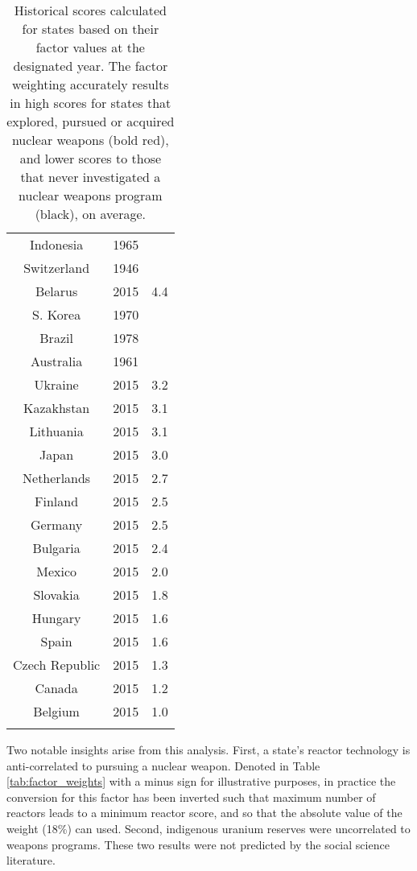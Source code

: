 \begin{table}
\begin{minipage}{.5\textwidth}
\begin{tabular}{|c|c|c|}
Indonesia & 1965 & \textbf{\color{red}{4.4}} \\
Switzerland & 1946 & \textbf{\color{red}{4.4}} \\
Belarus & 2015 & 4.4 \\
S. Korea & 1970 & \textbf{\color{red}{4.4}} \\
Brazil & 1978 & \textbf{\color{red}{4.3}} \\
Australia & 1961 & \textbf{\color{red}{3.9}} \\
Ukraine & 2015 & 3.2 \\
Kazakhstan & 2015 & 3.1 \\
Lithuania & 2015 & 3.1 \\
Japan & 2015 & 3.0 \\
Netherlands & 2015 & 2.7 \\
Finland & 2015 & 2.5 \\
Germany & 2015 & 2.5 \\
Bulgaria & 2015 & 2.4 \\
Mexico & 2015 & 2.0 \\
Slovakia & 2015 & 1.8 \\
Hungary & 2015 & 1.6 \\
Spain & 2015 & 1.6 \\
Czech Republic & 2015 & 1.3 \\
Canada & 2015 & 1.2 \\
Belgium & 2015 & 1.0 \\
        & & \\
\hline
\end{tabular}
\end{minipage}\hfill
\caption{Historical scores calculated for states based on their factor values at the designated year. The factor weighting accurately results in high scores for states that explored, pursued or acquired nuclear weapons (bold red), and lower scores to those that never investigated a nuclear weapons program (black), on average.}
\label{tab:state_scores}
\end{table}


Two notable insights arise from this analysis. First, a state's reactor technology is anti-correlated to pursuing a nuclear weapon.  Denoted in Table \ref{tab:factor_weights} with a minus sign for illustrative purposes, in practice the conversion for this factor has been inverted such that maximum number of reactors leads to a minimum reactor score, and so that the absolute value of the weight (18\%) can used.  Second, indigenous uranium reserves were uncorrelated to weapons programs. These two results were not predicted by the social science literature\cite{li_model-based_2010}.


